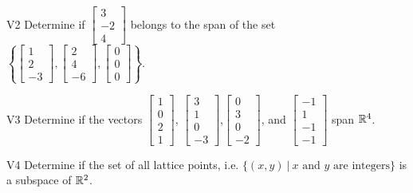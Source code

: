 \documentclass{sbgLAexam}
\begin{document}
\begin{problem}{V2}
  Determine if
  \(\begin{bmatrix} 3 \\ -2 \\ 4 \end{bmatrix}\)
  belongs to the span of the set
  \(\left\{
    \begin{bmatrix} 1 \\ 2 \\ -3 \end{bmatrix},
    \begin{bmatrix} 2 \\ 4 \\ -6 \end{bmatrix},
    \begin{bmatrix} 0 \\ 0 \\ 0 \end{bmatrix}
    \right\}
  \).
\end{problem}
\newpage

\begin{problem}{V3}
Determine if the vectors $\begin{bmatrix} 1 \\ 0 \\ 2 \\1 \end{bmatrix}$, $\begin{bmatrix} 3 \\ 1 \\ 0 \\ -3 \end{bmatrix}$,$\begin{bmatrix} 0 \\ 3 \\ 0 \\ -2 \end{bmatrix}$, and $\begin{bmatrix}-1 \\ 1 \\ -1 \\ -1 \end{bmatrix}$ span $\mathbb{R}^4$.
\end{problem}

\begin{problem}{V4}
Determine if the set of all lattice points, i.e. $\{(x,y)\ \big|\ \text{$x$ and $y$ are integers} \}$ is a subspace of $\mathbb{R}^2$.
\end{problem}
\newpage
\end{document}
